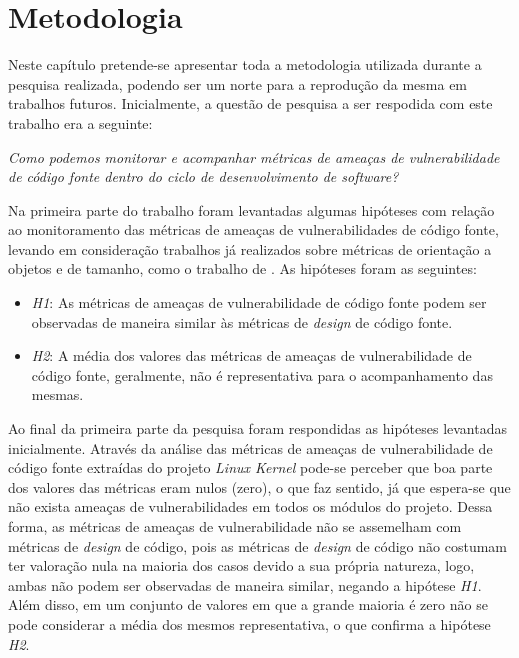 \chapter{Metodologia}\label{metodologia}

Neste capítulo pretende-se apresentar toda a metodologia utilizada durante a
pesquisa realizada, podendo ser um norte para a reprodução da mesma em trabalhos
futuros. Inicialmente, a questão de pesquisa a ser respodida com este trabalho era a
seguinte:

\begin{center}
  \textit{Como podemos monitorar e acompanhar métricas de ameaças de
    vulnerabilidade de código fonte dentro do ciclo de desenvolvimento de
    software?
}
\end{center}

Na primeira parte do trabalho foram levantadas algumas hipóteses com relação ao
monitoramento das métricas de ameaças de vulnerabilidades de código fonte,
levando em consideração trabalhos já realizados sobre métricas de orientação a
objetos e de tamanho, como o trabalho de . As hipóteses
foram as seguintes:

\begin{itemize}
  \item \textit{H1}: As métricas de ameaças de vulnerabilidade de código fonte
  podem ser observadas de maneira similar às métricas de \textit{design} de código
  fonte.

  \item \textit{H2}: A média dos valores das métricas de ameaças de vulnerabilidade de
  código fonte, geralmente, não é representativa para o acompanhamento das mesmas.

\end{itemize}

Ao final da primeira parte da pesquisa foram respondidas as hipóteses levantadas
inicialmente. Através da análise das métricas de ameaças de vulnerabilidade de
código fonte extraídas do projeto \textit{Linux Kernel} pode-se perceber que boa
parte dos valores das métricas eram nulos (zero), o que faz sentido, já que
espera-se que não exista ameaças de vulnerabilidades em todos os módulos do
projeto. Dessa forma, as métricas de ameaças de vulnerabilidade não se
assemelham com métricas de \textit{design} de código, pois as métricas de
\textit{design} de código não costumam ter valoração nula na maioria dos casos
devido a sua própria natureza, logo, ambas não podem ser observadas de maneira
similar, negando a hipótese \textit{H1}. Além disso, em um conjunto de valores
em que a grande maioria é zero não se pode considerar a média dos mesmos
representativa, o que confirma a hipótese \textit{H2}.


